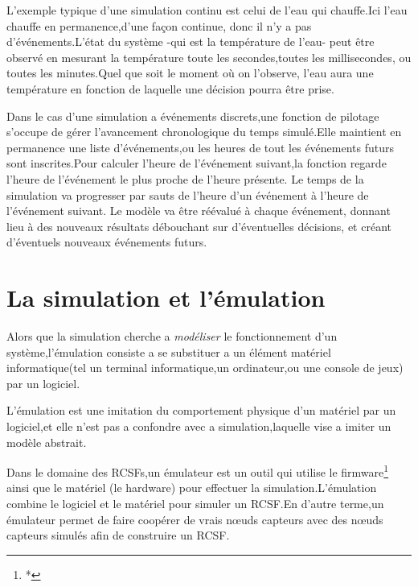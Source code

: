 L'exemple typique d'une simulation continu est celui de l'eau qui chauffe.Ici l'eau chauffe en permanence,d'une façon continue, donc il n'y a pas d'événements.L'état du système -qui est la température de l'eau- peut être observé en mesurant la température toute les secondes,toutes les millisecondes, ou toutes  les minutes.Quel que soit le moment où on l’observe, l’eau aura une température en fonction de laquelle une décision pourra être prise.
  
Dans le cas d'une simulation a événements discrets,une fonction de pilotage s'occupe de gérer l’avancement chronologique du temps simulé.Elle maintient en permanence une liste d'événements,ou les heures de tout les événements futurs sont inscrites.Pour calculer l’heure de l’événement suivant,la fonction regarde l’heure de l’événement le plus proche de l’heure présente. Le temps de la simulation va progresser par sauts de l’heure d’un événement à l’heure de l’événement suivant. Le modèle va être réévalué à chaque événement, donnant lieu à des nouveaux résultats débouchant sur d’éventuelles décisions, et créant d’éventuels nouveaux événements futurs.



\section{La simulation et l'émulation}
Alors que la simulation cherche a \emph{modéliser} le fonctionnement d'un système,l'émulation consiste a se substituer a un élément matériel informatique(tel un terminal informatique,un ordinateur,ou une console de jeux) par un logiciel.

L'émulation est une imitation du comportement physique d'un matériel par un logiciel,et elle n'est pas a confondre avec a simulation,laquelle vise a imiter un modèle abstrait.

Dans le domaine des RCSFs,un émulateur  est un outil qui utilise le firmware\footnote{*} ainsi que le matériel (le hardware) pour effectuer la simulation.L'émulation combine le logiciel et le matériel pour simuler un RCSF.En d'autre terme,un émulateur permet de faire coopérer de vrais nœuds capteurs avec des nœuds capteurs simulés afin de construire un RCSF.


